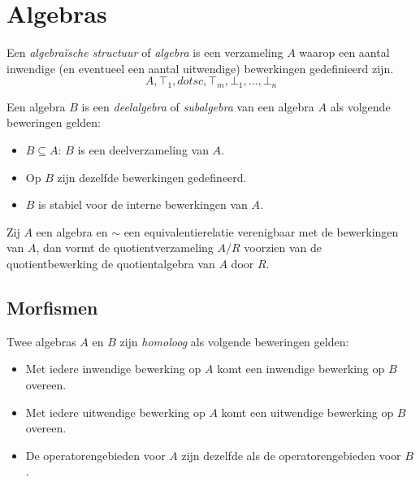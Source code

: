\documentclass[main.tex]{subfiles}
\begin{document}
\chapter{Algebras}
\label{cha:algebras}

\begin{de}
  \label{de:algebra}
  Een \emph{algebra\"ische structuur} of \emph{algebra} is een verzameling $A$ waarop een aantal inwendige (en eventueel een aantal uitwendige) bewerkingen gedefinieerd zijn.
  \[ A,\top_{1},dotsc,\top_{m},\bot_{1},\dotsc,\bot_{n} \]
\end{de}

\begin{de}
  Een algebra $B$ is een \emph{deelalgebra} of \emph{subalgebra} van een algebra $A$ als volgende beweringen gelden:
  \begin{itemize}
  \item $B \subseteq A$: $B$ is een deelverzameling van $A$.
  \item Op $B$ zijn dezelfde bewerkingen gedefineerd.
  \item $B$ is stabiel voor de interne bewerkingen van $A$.
  \end{itemize}
\end{de}

\begin{de}
  Zij $A$ een algebra en $\sim$ een equivalentierelatie verenigbaar met de bewerkingen van $A$, dan vormt de quotientverzameling $A/R$ voorzien van de quotientbewerking de quotientalgebra van $A$ door $R$.
\end{de}

\section{Morfismen}
\label{sec:morfismen}

\begin{de}
  Twee algebras $A$ en $B$ zijn \emph{homoloog} als volgende beweringen gelden:
  \begin{itemize}
  \item Met iedere inwendige bewerking op $A$ komt een inwendige bewerking op $B$ overeen. 
  \item Met iedere uitwendige bewerking op $A$ komt een uitwendige bewerking op $B$ overeen.
  \item De operatorengebieden voor $A$ zijn dezelfde als de operatorengebieden voor $B$.
  \end{itemize}
\end{de}
\end{document}
